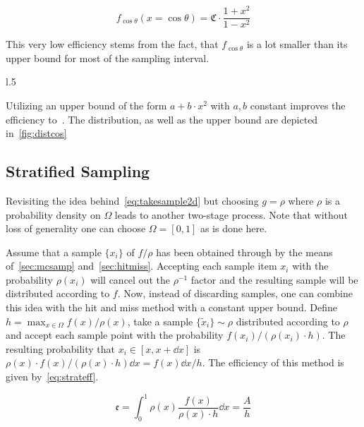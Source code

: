 \begin{equation}
  \label{eq:distcos}
  f_{\cos\theta}(x=\cos\theta) = \mathfrak{C}\cdot\frac{1+x^2}{1-x^2}
\end{equation}

This very low efficiency stems from the fact, that \(f_{\cos\theta}\)
is a lot smaller than its upper bound for most of the sampling
interval.

\begin{wrapfigure}{l}{.5\textwidth}
  \caption{\label{fig:distcos} The distribution~\eqref{eq:distcos} and an upper bound of
    the form \(a + b\cdot x^2\).}
\end{wrapfigure}

Utilizing an upper bound of the form \(a + b\cdot x^2\) with \(a, b\)
constant improves the efficiency
to~. The distribution, as well as the
upper bound are depicted in~\ref{fig:distcos}

\subsection{Stratified Sampling}%
\label{sec:stratsamp}

Revisiting the idea behind~\eqref{eq:takesample2d} but choosing
\(g=\rho\) where \(\rho\) is a probability density on \(\Omega\)
leads to another two-stage process. Note that without loss of
generality one can choose \(\Omega = [0, 1]\) as is done here.

Assume that a sample \(\{x_i\}\) of \(f/\rho\) has been obtained
through by the means of~\ref{sec:mcsamp}
and~\ref{sec:hitmiss}. Accepting each sample item \(x_i\) with the
probability \(\rho(x_i)\) will cancel out the \(\rho^{-1}\) factor and
the resulting sample will be distributed according to \(f\). Now,
instead of discarding samples, one can combine this idea with the hit
and miss method with a constant upper bound. Define
\(h=\max_{x\in\Omega}f(x)/\rho(x)\), take a sample
\(\{\tilde{x}_i\}\sim\rho\) distributed according to \(\rho\) and accept
each sample point with the probability \(f(x_i)/(\rho(x_i)\cdot
h)\). The resulting probability that \(x_i\in[x, x+\dd{x}]\) is
\(\rho(x)\cdot f(x)/(\rho(x)\cdot h)\dd{x}=f(x)\dd{x}/h\). The efficiency
of this method is given by~\eqref{eq:strateff}.

\begin{equation}
  \label{eq:strateff}
  \mathfrak{e} = \int_0^1\rho(x)\frac{f(x)}{\rho(x)\cdot h}\dd{x} = \frac{A}{h}
\end{equation}

